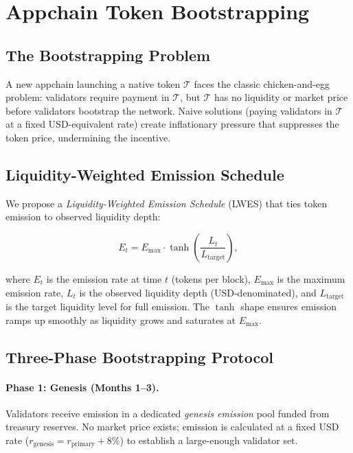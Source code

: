\section{Appchain Token Bootstrapping}

\label{sec:bootstrapping}

\subsection{The Bootstrapping Problem}

A new appchain launching a native token $\mathcal{T}$ faces the classic chicken-and-egg
problem: validators require payment in $\mathcal{T}$, but $\mathcal{T}$ has no liquidity
or market price before validators bootstrap the network. Naive solutions (paying validators
in $\mathcal{T}$ at a fixed USD-equivalent rate) create inflationary pressure that suppresses
the token price, undermining the incentive.

\subsection{Liquidity-Weighted Emission Schedule}

We propose a \emph{Liquidity-Weighted Emission Schedule} (LWES) that ties token emission
to observed liquidity depth:

\begin{equation}
  E_t = E_{\max} \cdot \tanh\!\left(\frac{L_t}{L_{\text{target}}}\right),
  \label{eq:lwes}
\end{equation}

where $E_t$ is the emission rate at time $t$ (tokens per block), $E_{\max}$ is the
maximum emission rate, $L_t$ is the observed liquidity depth (USD-denominated), and
$L_{\text{target}}$ is the target liquidity level for full emission. The $\tanh$ shape
ensures emission ramps up smoothly as liquidity grows and saturates at $E_{\max}$.

\subsection{Three-Phase Bootstrapping Protocol}

\paragraph{Phase 1: Genesis (Months 1--3).}
Validators receive emission in a dedicated \emph{genesis emission} pool funded from
treasury reserves. No market price exists; emission is calculated at a fixed USD
rate ($r_{\text{genesis}} = r_{\text{primary}} + 8\%$) to establish a large-enough
validator set.

